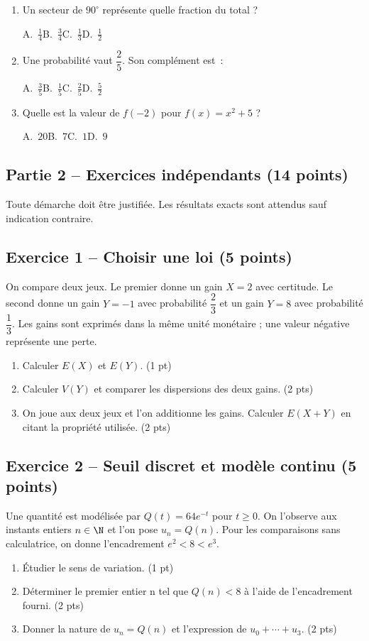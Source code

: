 \begin{enumerate}
\item Un secteur de $90^\circ$ représente quelle fraction du total ?\par A.~$\frac{1}{4}$\quad B.~$\frac{3}{4}$\quad C.~$\frac{1}{3}$\quad D.~$\frac{1}{2}$
\item Une probabilité vaut $\dfrac{2}{5}$. Son complément est~:\par A.~$\frac{3}{5}$\quad B.~$\frac{1}{5}$\quad C.~$\frac{2}{5}$\quad D.~$\frac{5}{2}$
\item Quelle est la valeur de $f(-2)$ pour $f(x)=x^2+5$ ?\par A.~$20$\quad B.~$7$\quad C.~$1$\quad D.~$9$
\end{enumerate}
\mxnewpage\subsection*{Partie 2 -- Exercices indépendants (14 points)}
Toute démarche doit être justifiée. Les résultats exacts sont attendus sauf indication contraire.
\subsection*{Exercice 1 -- Choisir une loi (5 points)}
On compare deux jeux. Le premier donne un gain $X=2$ avec certitude. Le second donne un gain $Y=-1$ avec probabilité $\dfrac23$ et un gain $Y=8$ avec probabilité $\dfrac13$. Les gains sont exprimés dans la même unité monétaire ; une valeur négative représente une perte.
\begin{enumerate}
\item Calculer $E(X)$ et $E(Y)$. \hfill(1 pt)
\item Calculer $V(Y)$ et comparer les dispersions des deux gains. \hfill(2 pts)
\item On joue aux deux jeux et l’on additionne les gains. Calculer $E(X+Y)$ en citant la propriété utilisée. \hfill(2 pts)
\end{enumerate}
\subsection*{Exercice 2 -- Seuil discret et modèle continu (5 points)}
Une quantité est modélisée par $Q(t)=64e^{-t}$ pour $t\geq0$. On l’observe aux instants entiers $n\in\N$ et l’on pose $u_n=Q(n)$. Pour les comparaisons sans calculatrice, on donne l’encadrement $e^2<8<e^3$.
\begin{enumerate}
\item Étudier le sens de variation. \hfill(1 pt)
\item Déterminer le premier entier n tel que $Q(n)<8$ à l’aide de l’encadrement fourni. \hfill(2 pts)
\item Donner la nature de $u_n=Q(n)$ et l’expression de $u_0+\cdots+u_3$. \hfill(2 pts)
\end{enumerate}
